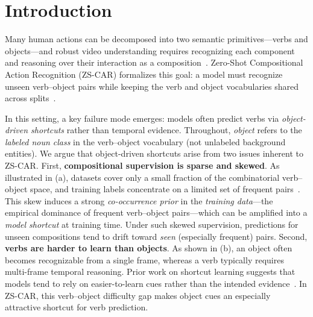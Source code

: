 \section{Introduction}
\label{sec:intro}


Many human actions can be decomposed into two semantic primitives—verbs and objects—and robust video understanding requires recognizing each component and reasoning over their interaction as a composition~\cite{goyal2017something, mat2020sthelse, damen2022ek100, diba2020hvu, bae2024devias}.
Zero-Shot Compositional Action Recognition (ZS-CAR) formalizes this goal: a model must recognize unseen verb–object pairs while keeping the verb and object vocabularies shared across splits~\cite{li2024c2c, jiang2025dhd, jung2025crr, ye2025logic}.












In this setting, a key failure mode emerges: models often predict verbs via \emph{object-driven shortcuts} rather than temporal evidence.
Throughout, \emph{object} refers to the \emph{labeled noun class} in the verb--object vocabulary (not unlabeled background entities).
We argue that object-driven shortcuts arise from two issues inherent to ZS-CAR.
First, \textbf{compositional supervision is sparse and skewed}.
As illustrated in  (a), datasets cover only a small fraction of the combinatorial verb--object space, and training labels concentrate on a limited set of frequent pairs~\cite{mat2020sthelse, damen2022ek100}.
This skew induces a strong \emph{co-occurrence prior} in the \emph{training data}—the empirical dominance of frequent verb–object pairs—which can be amplified into a \emph{model shortcut} at training time.
Under such skewed supervision, predictions for unseen compositions tend to drift toward \emph{seen} (especially frequent) pairs.
Second, \textbf{verbs are harder to learn than objects}.
As shown in  (b), an object often becomes recognizable from a single frame, whereas a verb typically requires multi-frame temporal reasoning.
Prior work on shortcut learning suggests that models tend to rely on easier-to-learn cues rather than the intended evidence~\cite{nam2020lff,li2018resound,singh2020dont,geirhos2018cuecon,scimeca2022shortcut}.
In ZS-CAR, this verb--object difficulty gap makes object cues an especially attractive shortcut for verb prediction.




